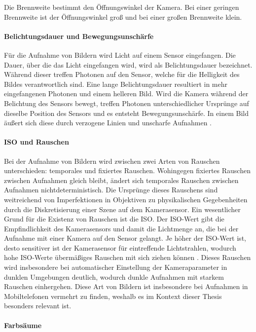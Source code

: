 Die Brennweite bestimmt den Öffnungswinkel der Kamera. Bei einer geringen Brennweite ist der Öffnungswinkel groß und bei einer großen Brennweite klein.

\paragraph{Belichtungsdauer und Bewegungsunschärfe}

Für die Aufnahme von Bildern wird Licht auf einem Sensor eingefangen. Die Dauer, über die das Licht eingefangen wird, wird als Belichtungsdauer bezeichnet. Während dieser treffen Photonen auf den Sensor, welche für die Helligkeit des Bildes verantwortlich sind. Eine lange Belichtungsdauer resultiert in mehr eingefangenen Photonen und einem helleren Bild. Wird die Kamera während der Belichtung des Sensors bewegt, treffen Photonen unterschiedlicher Ursprünge auf dieselbe Position des Sensors und es entsteht Bewegungsunschärfe. In einem Bild äußert sich diese durch verzogene Linien und unscharfe Aufnahmen \cite{motion_blur}.

\paragraph{ISO und Rauschen}

Bei der Aufnahme von Bildern wird zwischen zwei Arten von Rauschen unterschieden: temporales und fixiertes Rauschen. Wohingegen fixiertes Rauschen zwischen Aufnahmen gleich bleibt, ändert sich temporales Rauschen zwischen Aufnahmen nichtdeterministisch. Die Ursprünge dieses Rauschens sind weitreichend von Imperfektionen in Objektiven zu physikalischen Gegebenheiten durch die Diskretisierung einer Szene auf dem Kamerasensor. Ein wesentlicher Grund für die Existenz von Rauschen ist die ISO. Der ISO-Wert gibt die Empfindlichkeit des Kamerasensors und damit die Lichtmenge an, die bei der Aufnahme mit einer Kamera auf den Sensor gelangt. Je höher der ISO-Wert ist, desto sensitiver ist der Kamerasensor für eintreffende Lichtstrahlen, wodurch hohe ISO-Werte übermäßiges Rauschen mit sich ziehen können \cite{camera_everything}. Dieses Rauschen wird insbesondere bei automatischer Einstellung der Kameraparameter in dunklen Umgebungen deutlich, wodurch dunkle Aufnahmen mit starkem Rauschen einhergehen. Diese Art von Bildern ist insbesondere bei Aufnahmen in Mobiltelefonen vermehrt zu finden, weshalb es im Kontext dieser Thesis besonders relevant ist.

\paragraph{Farbsäume}

